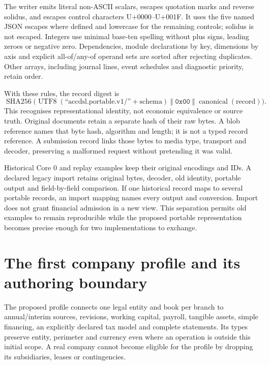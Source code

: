 The writer emits literal non-ASCII scalars, escapes quotation marks and reverse
solidus, and escapes control characters U+0000--U+001F. It uses the five named
JSON escapes where defined and lowercase  for the
remaining controls; solidus is not escaped. Integers use minimal base-ten
spelling without plus signs, leading zeroes or negative zero. Dependencies,
module declarations by key, dimensions by axis and explicit all-of/any-of
operand sets are sorted after rejecting duplicates. Other arrays, including
journal lines, event schedules and diagnostic priority, retain order.

With these rules, the record digest is
\[
\operatorname{SHA256}\bigl(
 \operatorname{UTF8}(\text{``accdsl.portable.v1/''}+\text{schema})
 \;\Vert\;\texttt{0x00}\;\Vert\;\operatorname{canonical}(\text{record})\bigr).
\]
This recognises representational identity, not economic equivalence or source
truth. Original documents retain a separate hash of their raw bytes. A blob
reference names that byte hash, algorithm and length; it is not a typed record
reference. A submission record links those bytes to media type, transport and
decoder, preserving a malformed request without pretending it was valid.

Historical Core 0 and replay examples keep their original encodings and IDs.
A declared legacy import retains original bytes, decoder, old identity, portable
output and field-by-field comparison. If one historical record maps to several
portable records, an import mapping names every output and conversion. Import
does not grant financial admission in a new view. This separation permits old
examples to remain reproducible while the proposed portable representation
becomes precise enough for two implementations to exchange.

\section{The first company profile and its authoring boundary}
\label{sec:portable-authoring}

The proposed  profile connects one legal entity and
book per branch to annual/interim sources, revisions, working capital, payroll,
tangible assets, simple financing, an explicitly declared tax model and complete
statements. Its types preserve entity, perimeter and currency even where an
operation is outside this initial scope. A real company cannot become eligible
for the profile by dropping its subsidiaries, leases or contingencies.

